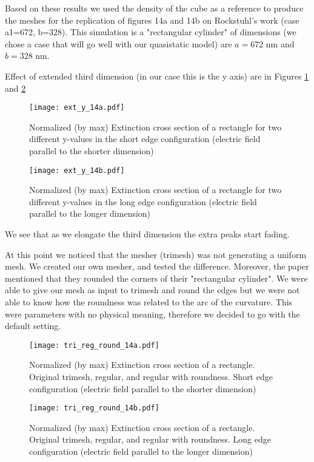 Based on these results we used the density of the cube as a reference to produce the meshes for the replication 
of figures 14a and 14b on Rockstuhl's work (case a1=672, b=328). This simulation is a "rectangular cylinder" of 
dimensions (we chose a case that will go well with our quasistatic model) are $a=672$ nm and $b=328$ nm. 

Effect of extended third dimension (in our case this is the y axis) are in Figures \ref{fig:ext_y_14a} and
\ref{fig:ext_y_14b}

\begin{figure}
    \centering
    \texttt{[image: ext\_y\_14a.pdf]} 
    \caption{Normalized (by max) Extinction cross section of a rectangle for two different y-values in the 
    short edge configuration (electric field parallel to the shorter dimension)}
    \label{fig:ext_y_14a}
 \end{figure}

 \begin{figure}
    \centering
    \texttt{[image: ext\_y\_14b.pdf]} 
    \caption{Normalized (by max) Extinction cross section of a rectangle for two different y-values in the 
    long edge configuration (electric field parallel to the longer dimension)}
    \label{fig:ext_y_14b}
 \end{figure}

We see that as we elongate the third dimension the extra peaks start fading. 

At this point we noticed that the mesher (trimesh) was not generating a uniform mesh. We created our 
own mesher, and tested the difference. Moreover, the paper mentioned that they rounded the corners of their
"rectangular cylinder". We were able to give our mesh as input to trimesh and round the edges but we were not able 
to know how the roundness was related to the arc of the curvature. This were parameters with no physical meaning, 
therefore we decided to go with the default setting. 


\begin{figure}
    \centering
    \texttt{[image: tri\_reg\_round\_14a.pdf]} 
    \caption{Normalized (by max) Extinction cross section of a rectangle. Original trimesh, regular, and regular with 
    roundness. Short edge configuration (electric field parallel to the shorter dimension)}
    \label{fig:tri_reg_round_14a}
 \end{figure}

 \begin{figure}
    \centering
    \texttt{[image: tri\_reg\_round\_14b.pdf]} 
    \caption{Normalized (by max) Extinction cross section of a rectangle.  Original trimesh, regular, and regular with 
    roundness. Long edge configuration (electric field parallel to the longer dimension)}
    \label{fig:tri_reg_round_14b}
 \end{figure}


